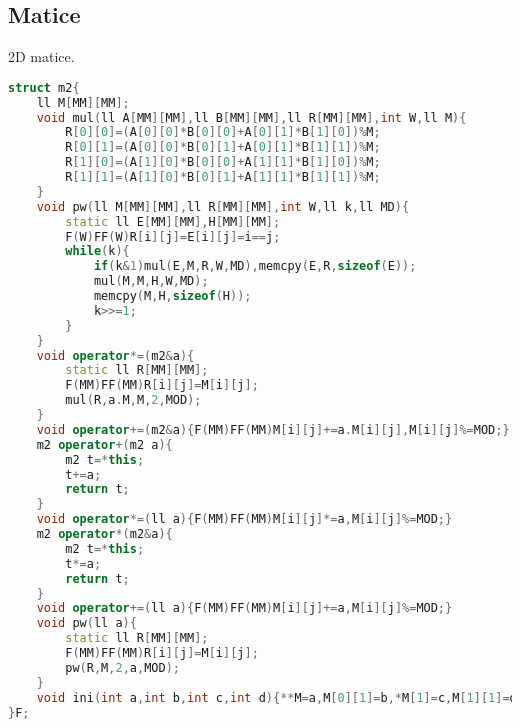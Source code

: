 \documentclass[11pt]{article}
\begin{document}
\subsection{Matice}
2D matice.
\begin{lstlisting}[language=C++]
struct m2{
    ll M[MM][MM];
    void mul(ll A[MM][MM],ll B[MM][MM],ll R[MM][MM],int W,ll M){
        R[0][0]=(A[0][0]*B[0][0]+A[0][1]*B[1][0])%M;
        R[0][1]=(A[0][0]*B[0][1]+A[0][1]*B[1][1])%M;
        R[1][0]=(A[1][0]*B[0][0]+A[1][1]*B[1][0])%M;
        R[1][1]=(A[1][0]*B[0][1]+A[1][1]*B[1][1])%M;
    }
    void pw(ll M[MM][MM],ll R[MM][MM],int W,ll k,ll MD){
        static ll E[MM][MM],H[MM][MM];
        F(W)FF(W)R[i][j]=E[i][j]=i==j;
        while(k){
            if(k&1)mul(E,M,R,W,MD),memcpy(E,R,sizeof(E));
            mul(M,M,H,W,MD);
            memcpy(M,H,sizeof(H));
            k>>=1;
        }
    }
    void operator*=(m2&a){
        static ll R[MM][MM];
        F(MM)FF(MM)R[i][j]=M[i][j];
        mul(R,a.M,M,2,MOD);
    }
    void operator+=(m2&a){F(MM)FF(MM)M[i][j]+=a.M[i][j],M[i][j]%=MOD;}
    m2 operator+(m2 a){
        m2 t=*this;
        t+=a;
        return t;
    }
    void operator*=(ll a){F(MM)FF(MM)M[i][j]*=a,M[i][j]%=MOD;}
    m2 operator*(m2&a){
        m2 t=*this;
        t*=a;
        return t;
    }
    void operator+=(ll a){F(MM)FF(MM)M[i][j]+=a,M[i][j]%=MOD;}
    void pw(ll a){
        static ll R[MM][MM];
        F(MM)FF(MM)R[i][j]=M[i][j];
        pw(R,M,2,a,MOD);
    }
    void ini(int a,int b,int c,int d){**M=a,M[0][1]=b,*M[1]=c,M[1][1]=d;}
}F;
\end{lstlisting}
\end{document}
